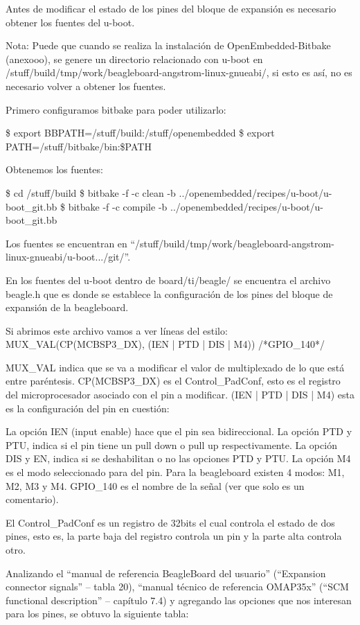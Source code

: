 Antes de modificar el estado de los pines del bloque de expansión es necesario obtener los fuentes del u-boot.

Nota: Puede que cuando se realiza la instalación de OpenEmbedded-Bitbake (anexooo), se genere un directorio relacionado con u-boot en /stuff/build/tmp/work/beagleboard-angstrom-linux-gnueabi/, si esto es así, no es necesario volver a obtener los fuentes.

Primero configuramos bitbake para poder utilizarlo:

\$ export BBPATH=/stuff/build:/stuff/openembedded
\$ export PATH=/stuff/bitbake/bin:\$PATH

Obtenemos los fuentes:

\$ cd /stuff/build
\$ bitbake -f -c clean -b ../openembedded/recipes/u-boot/u-boot\_git.bb
\$ bitbake -f -c compile -b ../openembedded/recipes/u-boot/u-boot\_git.bb

Los fuentes se encuentran en “/stuff/build/tmp/work/beagleboard-angstrom-linux-gnueabi/u-boot.../git/”.

En los fuentes del u-boot dentro de board/ti/beagle/ se encuentra el archivo beagle.h que es donde se establece la configuración de los pines del bloque de expansión de la beagleboard.

Si abrimos este archivo vamos a ver líneas del estilo: 
MUX\_VAL(CP(MCBSP3\_DX), (IEN | PTD | DIS | M4)) /*GPIO\_140*/\ 

MUX\_VAL indica que se va a modificar el valor de multiplexado de lo que está entre paréntesis. 
CP(MCBSP3\_DX) es el Control\_PadConf, esto es el registro del microprocesador asociado con el 
pin a modificar. 
(IEN | PTD | DIS | M4) esta es la configuración del pin en cuestión: 

La opción IEN (input enable) hace que el pin sea bidireccional. 
La opción PTD y PTU, indica si el pin tiene un pull down o pull up respectivamente. 
La opción DIS y EN, indica si se deshabilitan o no las opciones PTD y PTU. 
La opción M4 es el modo seleccionado para del pin. Para la beagleboard existen 4 modos: M1, M2, M3 y M4.
GPIO\_140 es el nombre de la señal (ver que solo es un comentario). 

El Control\_PadConf es un registro de 32bits el cual controla el estado de dos pines, esto es, la parte 
baja del registro controla un pin y la parte alta controla otro. 

Analizando el “manual de referencia BeagleBoard del usuario” (“Expansion connector signals” – 
tabla 20), “manual técnico de referencia OMAP35x” (“SCM functional description” – capítulo 7.4) 
y agregando las opciones que nos interesan para los pines, se obtuvo la siguiente tabla: 

